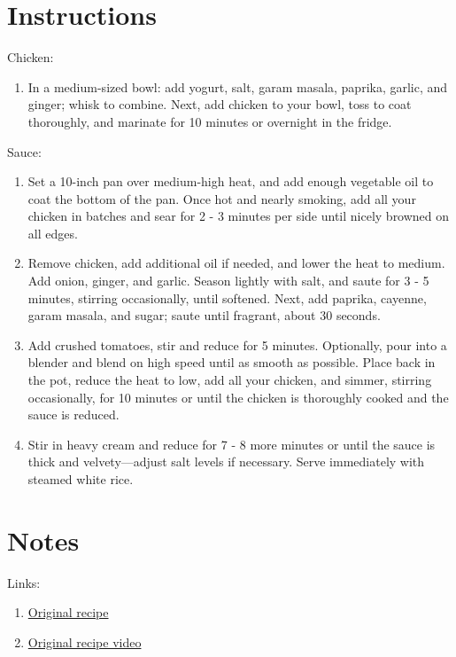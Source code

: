 \documentclass[11pt]{article}
\begin{document}
	\section*{Instructions}
	Chicken:
	\begin{enumerate}
		\item In a medium-sized bowl: add yogurt, salt, garam masala, paprika, garlic, and ginger; whisk to combine. Next, add chicken to your bowl, toss to coat thoroughly, and marinate for 10 minutes or overnight in the fridge.
	\end{enumerate}
	Sauce:
	\begin{enumerate}
		\item Set a 10-inch pan over medium-high heat, and add enough vegetable oil to coat the bottom of the pan. Once hot and nearly smoking, add all your chicken in batches and sear for 2 - 3 minutes per side until nicely browned on all edges. 
		\item Remove chicken, add additional oil if needed, and lower the heat to medium. Add onion, ginger, and garlic. Season lightly with salt, and saute for 3 - 5 minutes, stirring occasionally, until softened. Next, add paprika, cayenne, garam masala, and sugar; saute until fragrant, about 30 seconds. 
		\item Add crushed tomatoes, stir and reduce for 5 minutes. Optionally, pour into a blender and blend on high speed until as smooth as possible. Place back in the pot, reduce the heat to low, add all your chicken, and simmer, stirring occasionally, for 10 minutes or until the chicken is thoroughly cooked and the sauce is reduced. 
		\item Stir in heavy cream and reduce for 7 - 8 more minutes or until the sauce is thick and velvety—adjust salt levels if necessary. Serve immediately with steamed white rice.
	\end{enumerate}
	
	\section*{Notes}
	Links:
	\begin{enumerate}
		\item \href{https://www.joshuaweissman.com/post/2-chicken-tikka-masala-but-cheaper}{Original recipe}
		\item\href{https://youtu.be/O5l1SMavklI}{Original recipe video} 
	\end{enumerate}
	
\end{document}
